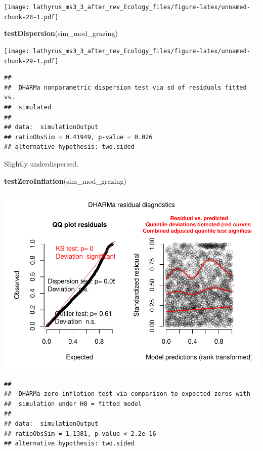 \documentclass[
]{article}
\newenvironment{Shaded}{\begin{snugshade}}{\end{snugshade}}
\newcommand{\KeywordTok}[1]{\textcolor[rgb]{0.13,0.29,0.53}{\textbf{#1}}}
\newcommand{\NormalTok}[1]{#1}
\begin{document}
\texttt{[image: lathyrus\_ms3\_3\_after\_rev\_Ecology\_files/figure-latex/unnamed-chunk-28-1.pdf]}

\begin{Shaded}
\begin{Highlighting}[]
\KeywordTok{testDispersion}\NormalTok{(sim\_mod\_grazing)}
\end{Highlighting}
\end{Shaded}

\texttt{[image: lathyrus\_ms3\_3\_after\_rev\_Ecology\_files/figure-latex/unnamed-chunk-29-1.pdf]}

\begin{verbatim}
## 
##  DHARMa nonparametric dispersion test via sd of residuals fitted vs.
##  simulated
## 
## data:  simulationOutput
## ratioObsSim = 0.41949, p-value = 0.026
## alternative hypothesis: two.sided
\end{verbatim}

Slightly underdispersed.

\begin{Shaded}
\begin{Highlighting}[]
\KeywordTok{testZeroInflation}\NormalTok{(sim\_mod\_grazing)}
\end{Highlighting}
\end{Shaded}

\includegraphics{lathyrus_ms3_3_after_rev_Ecology_files/figure-latex/unnamed-chunk-30-1.pdf}

\begin{verbatim}
## 
##  DHARMa zero-inflation test via comparison to expected zeros with
##  simulation under H0 = fitted model
## 
## data:  simulationOutput
## ratioObsSim = 1.1381, p-value < 2.2e-16
## alternative hypothesis: two.sided
\end{verbatim}
\end{document}

